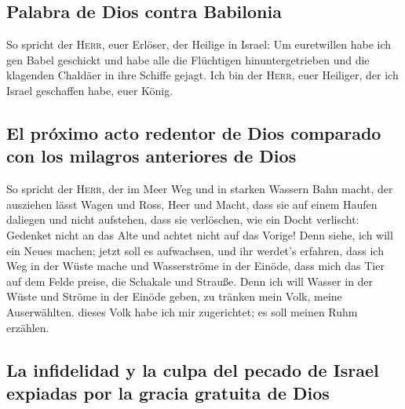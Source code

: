 \hypertarget{palabra-de-dios-contra-babilonia}{%
\subsection{Palabra de Dios contra
Babilonia}\label{palabra-de-dios-contra-babilonia}}

 So spricht der \textsc{Herr}, euer Erlöser, der Heilige
in Israel: Um euretwillen habe ich gen Babel geschickt und habe alle die
Flüchtigen hinuntergetrieben und die klagenden Chaldäer in ihre Schiffe
gejagt.  Ich bin der \textsc{Herr}, euer Heiliger, der
ich Israel geschaffen habe, euer König.

\hypertarget{el-pruxf3ximo-acto-redentor-de-dios-comparado-con-los-milagros-anteriores-de-dios}{%
\subsection{El próximo acto redentor de Dios comparado con los milagros
anteriores de
Dios}\label{el-pruxf3ximo-acto-redentor-de-dios-comparado-con-los-milagros-anteriores-de-dios}}

 So spricht der \textsc{Herr}, der im Meer Weg und in
starken Wassern Bahn macht,  der ausziehen lässt Wagen
und Ross, Heer und Macht, dass sie auf einem Haufen daliegen und nicht
aufstehen, dass sie verlöschen, wie ein Docht verlischt: 
Gedenket nicht an das Alte und achtet nicht auf das Vorige!
 Denn siehe, ich will ein Neues machen; jetzt soll es
aufwachsen, und ihr werdet's erfahren, dass ich Weg in der Wüste mache
und Wasserströme in der Einöde,  dass mich das Tier auf
dem Felde preise, die Schakale und Strauße. Denn ich will Wasser in der
Wüste und Ströme in der Einöde geben, zu tränken mein Volk, meine
Auserwählten.  dieses Volk habe ich mir zugerichtet; es
soll meinen Ruhm erzählen.

\hypertarget{la-infidelidad-y-la-culpa-del-pecado-de-israel-expiadas-por-la-gracia-gratuita-de-dios}{%
\subsection{La infidelidad y la culpa del pecado de Israel expiadas por
la gracia gratuita de
Dios}\label{la-infidelidad-y-la-culpa-del-pecado-de-israel-expiadas-por-la-gracia-gratuita-de-dios}}

